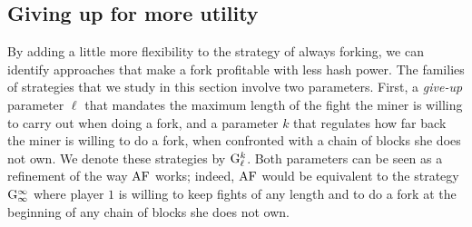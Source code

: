 %

\subsection{Giving up for more utility}
\label{sec-giving-up}

By adding a little more flexibility to the strategy of always forking, we can identify approaches that make a fork profitable with less hash power. 
The families of strategies that we study in this section involve two parameters. First, a \textit{give-up} parameter $\ell$ that mandates the maximum length of the fight the miner is willing to carry out when doing a fork, and a parameter $k$ that regulates how far back the miner is willing to do a fork, when confronted with a chain of blocks she does not own. We denote these strategies by ${\rm {G}}_\ell^k$. Both parameters can be seen as a refinement of the way $\text{\rm AF}$ works; indeed, $\text{\rm AF}$ would be equivalent to the strategy ${\rm {G}}_\infty^\infty$ where player $1$ is willing to keep fights of any length and to do a fork at the beginning of any chain of blocks she does not own.  

